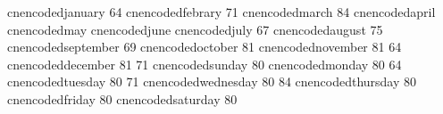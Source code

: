    cnencodedjanuary          { {64}}
   cnencodedfebrary          { {71}}
   cnencodedmarch            { {84}}
   cnencodedapril            {}
   cnencodedmay              {}
   cnencodedjune             {}
   cnencodedjuly             { {67}}
   cnencodedaugust           { {75}}
   cnencodedseptember        { {69}}
   cnencodedoctober          { {81}}
   cnencodednovember         { {81} {64}}
   cnencodeddecember         { {81} {71}}
   cnencodedsunday           { {80}}
   cnencodedmonday           { {80} {64}}
   cnencodedtuesday          { {80} {71}}
   cnencodedwednesday        { {80} {84}}
   cnencodedthursday         { {80}}
   cnencodedfriday           { {80}}
   cnencodedsaturday         { {80}}
\stopencoding

\protect \endinput
